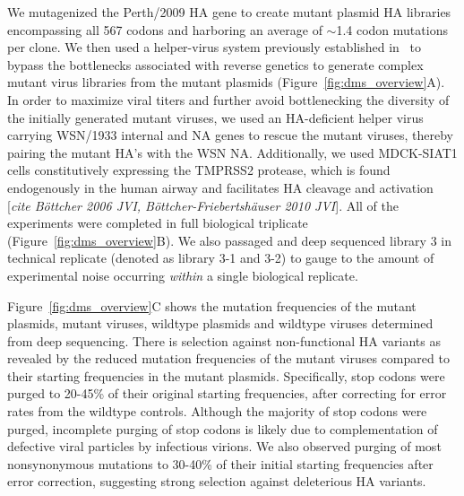 \documentclass[11pt]{article}
\newcommand{\comment}[1]{{\color{red}[\textsl{#1}]}}
\begin{document}
We mutagenized the Perth/2009 HA gene to create mutant plasmid HA libraries encompassing all 567 codons and harboring an average of $\sim$1.4 codon mutations per clone.
We then used a helper-virus system previously established in~\cite{doud2016accurate} to bypass the bottlenecks associated with reverse genetics to generate complex mutant virus libraries from the mutant plasmids (Figure~\ref{fig:dms_overview}A).
In order to maximize viral titers and further avoid bottlenecking the diversity of the initially generated mutant viruses, we used an HA-deficient helper virus carrying WSN/1933 internal and NA genes to rescue the mutant viruses, thereby pairing the mutant HA's with the WSN NA.
Additionally, we used MDCK-SIAT1 cells constitutively expressing the TMPRSS2 protease, which is found endogenously in the human airway and facilitates HA cleavage and activation \comment{cite B\"{o}ttcher 2006 JVI, B\"{o}ttcher-Friebertsh\"{a}user 2010 JVI}.
All of the experiments were completed in full biological triplicate (Figure~\ref{fig:dms_overview}B). 
We also passaged and deep sequenced library 3 in technical replicate (denoted as library 3-1 and 3-2) to gauge to the amount of experimental noise occurring \textit{within} a single biological replicate.

Figure~\ref{fig:dms_overview}C shows the mutation frequencies of the mutant plasmids, mutant viruses, wildtype plasmids and wildtype viruses determined from deep sequencing. 
There is selection against non-functional HA variants as revealed by the reduced mutation frequencies of the mutant viruses compared to their starting frequencies in the mutant plasmids.
Specifically, stop codons were purged to 20-45\% of their original starting frequencies, after correcting for error rates from the wildtype controls.
Although the majority of stop codons were purged, incomplete purging of stop codons is likely due to complementation of defective viral particles by infectious virions. 
We also observed purging of most nonsynonymous mutations to 30-40\% of their initial starting frequencies after error correction, suggesting strong selection against deleterious HA variants.
\end{document}
